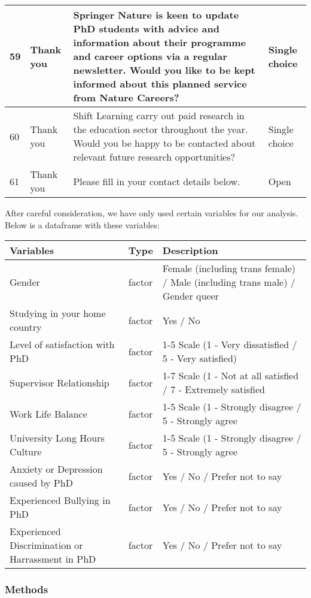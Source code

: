 \documentclass[
]{article}
\begin{document}
\begin{table}[H]
\begin{tabular}{l|l|l|l}
\hline
59 & Thank you & Springer Nature is keen to update PhD students with advice and information about their programme and career options via a regular newsletter. Would you like to be kept informed about this planned service from Nature Careers? & Single choice\\
\hline
60 & Thank you & Shift Learning carry out paid research in the education sector throughout the year. Would you be happy to be contacted about relevant future research opportunities? & Single choice\\
\hline
61 & Thank you & Please fill in your contact details below. & Open\\
\hline
\end{tabular}
\end{table}

After careful consideration, we have only used certain variables for our
analysis. Below is a dataframe with these variables:

\begin{tabular}{l|l|l}
\hline
Variables & Type & Description\\
\hline
Gender & factor & Female (including trans female) / Male (including trans male) / Gender queer\\
\hline
Studying in your home country & factor & Yes / No\\
\hline
Level of satisfaction with PhD & factor & 1-5 Scale (1 - Very dissatisfied / 5 - Very satisfied)\\
\hline
Supervisor Relationship & factor & 1-7 Scale (1 - Not at all satisfied / 7 - Extremely satisfied\\
\hline
Work Life Balance & factor & 1-5 Scale (1 - Strongly disagree / 5 - Strongly agree\\
\hline
University Long Hours Culture & factor & 1-5 Scale (1 - Strongly disagree / 5 - Strongly agree\\
\hline
Anxiety or Depression caused by PhD & factor & Yes / No / Prefer not to say\\
\hline
Experienced Bullying in PhD & factor & Yes / No / Prefer not to say\\
\hline
Experienced Discrimination or Harrassment in PhD & factor & Yes / No / Prefer not to say\\
\hline
\end{tabular}

\hypertarget{methods}{%
\subsubsection{Methods}\label{methods}}
\end{document}
